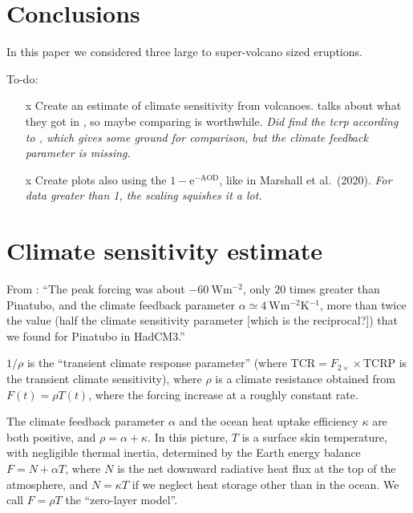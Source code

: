 \documentclass{ametsocV5}
\begin{document}
\section{Conclusions}


In this paper we considered three large to super-volcano sized eruptions.

\clearpage

To-do:

\begin{itemize}
  \item[\lbrack{}x\rbrack{}] Create an estimate of climate sensitivity from volcanoes.
    \citet{gregory2016} talks about what they got in \citet{jones2005}, so maybe comparing
    is worthwhile. \emph{Did find the \ac{tcrp} according to \citet{merlis2014}, which gives
      some ground for comparison, but the climate feedback parameter is missing.}
  \item[\lbrack{}x\rbrack{}] Create plots also using the \(1-\mathrm{e}^{-\mathrm{AOD}}\), like
    in Marshall et al.\ (2020). \emph{For data greater than 1, the scaling squishes it a
      lot.}
\end{itemize}

\section*{Climate sensitivity estimate}

From \citet{gregory2016}: ``The peak forcing was about \(\SI{-60}{\watt\metre^{-2}}\),
only \(20\) times greater than Pinatubo, and the climate feedback parameter \(\alpha
\simeq \SI{4}{\watt\metre^{-2}\kelvin^{-1}}\), more than twice the value (half the
climate sensitivity parameter [which is the reciprocal?]) that we found for Pinatubo in
HadCM3.''

\(1/\rho \) is the ``transient climate response parameter'' (where
\(\mathrm{TCR}=F_{2\times}\times \mathrm{TCRP}\) is the transient climate sensitivity),
where \(\rho \) is a climate resistance obtained from \(F(t)=\rho T(t)\), where the
forcing increase at a roughly constant rate.

The climate feedback parameter \(\alpha\) and the ocean heat uptake efficiency
\(\kappa\) are both positive, and \(\rho =\alpha +\kappa \). In this picture, \(T\) is a
surface skin temperature, with negligible thermal inertia, determined by the Earth
energy balance \(F=N+\alpha T\), where \(N\) is the net downward radiative heat flux at
the top of the atmosphere, and \(N=\kappa T\) if we neglect heat storage other than in
the ocean. We call \(F=\rho T\) the ``zero-layer model''.
\end{document}
